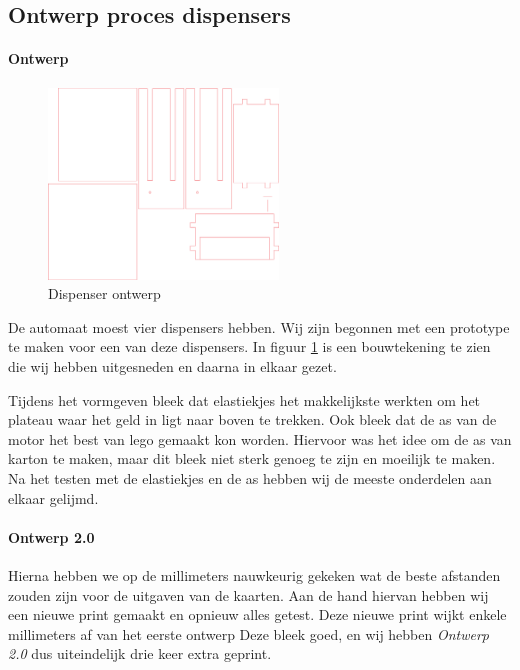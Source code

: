 \documentclass{article}
\begin{document}
\subsection{Ontwerp proces dispensers}

\paragraph{Ontwerp}

\begin{figure}[!h]
       \centering
       \includegraphics[height=2.0in]{dispenser.pdf}
       \caption{Dispenser ontwerp}
       \label{fig: Dispenser ontwerp}
\end{figure}

De automaat moest vier dispensers hebben.
Wij zijn begonnen met een prototype te maken voor een van deze dispensers.
In figuur \ref{fig: Dispenser ontwerp} is een bouwtekening te zien die wij hebben uitgesneden en daarna in elkaar gezet.

Tijdens het vormgeven bleek dat elastiekjes het makkelijkste werkten om het plateau waar het geld in ligt naar boven te trekken.
Ook bleek dat de as van de motor het best van lego gemaakt kon worden.
Hiervoor was het idee om de as van karton te maken, maar dit bleek niet sterk genoeg te zijn en moeilijk te maken.
Na het testen met de elastiekjes en de as hebben wij de meeste onderdelen aan elkaar gelijmd.

\paragraph{Ontwerp 2.0}

Hierna hebben we op de millimeters nauwkeurig gekeken wat de beste afstanden zouden zijn voor de uitgaven van de kaarten.
Aan de hand hiervan hebben wij een nieuwe print gemaakt en opnieuw alles getest.
Deze nieuwe print wijkt enkele millimeters af van het eerste ontwerp
Deze bleek goed, en wij hebben \emph{Ontwerp 2.0} dus uiteindelijk drie keer extra geprint.
\end{document}
